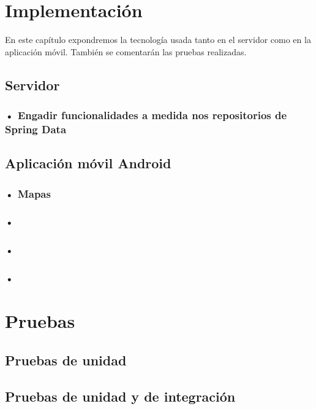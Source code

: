 
\section{Implementación}
En este capítulo expondremos la tecnología usada tanto en el servidor como en la aplicación móvil. También se comentarán las pruebas realizadas.




\subsection{Servidor}
\subsubsection{• Engadir funcionalidades a medida nos repositorios de Spring Data}
\subsection{Aplicación móvil Android}
\subsubsection{• Mapas}
\subsubsection{•}
\subsubsection{•}
\subsubsection{•}
\section{Pruebas}
\subsection{Pruebas de unidad}
\subsection{Pruebas de unidad y de integración}


